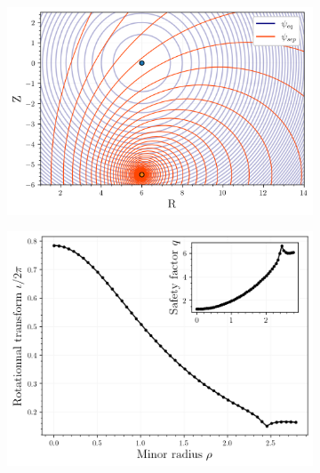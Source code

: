 \begin{figure}[H]
    \centering
    \begin{minipage}{0.45\textwidth} %
        \centering
        \begin{subfigure}[b]{\textwidth}
            \centering
            \includegraphics[width=\textwidth]{images/toytok/unperturbed/sepflux.png}
            \caption{}
            \label{fig:toytok-base-psi}
        \end{subfigure}
        \vfill
        \vspace{10px}
        \vfill
        \begin{subfigure}[b]{0.99\textwidth}
            \centering
            \includegraphics[width=\textwidth]{images/toytok/unperturbed/q-iota-squared.png}

\end{subfigure}
\end{minipage}
\end{figure}
